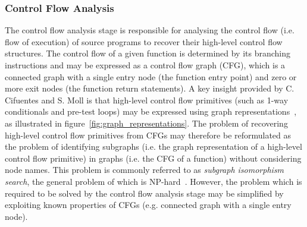 
\subsubsection{Control Flow Analysis}
\label{sec:lit_review_control_flow_analysis}

The control flow analysis stage is responsible for analysing the control flow (i.e. flow of execution) of source programs to recover their high-level control flow structures. The control flow of a given function is determined by its branching instructions and may be expressed as a control flow graph (CFG), which is a connected graph with a single entry node (the function entry point) and zero or more exit nodes (the function return statements). A key insight provided by C. Cifuentes and S. Moll is that high-level control flow primitives (such as 1-way conditionals and pre-test loops) may be expressed using graph representations~\cite{reverse_comp, decomp_of_llvm}, as illustrated in figure~\ref{fig:graph_representations}. The problem of recovering high-level control flow primitives from CFGs may therefore be reformulated as the problem of identifying subgraphs (i.e. the graph representation of a high-level control flow primitive) in graphs (i.e. the CFG of a function) without considering node names. This problem is commonly referred to as \textit{subgraph isomorphism search}, the general problem of which is NP-hard~\cite{subgraph_isomorphism_algorithms}. However, the problem which is required to be solved by the control flow analysis stage may be simplified by exploiting known properties of CFGs (e.g. connected graph with a single entry node).

